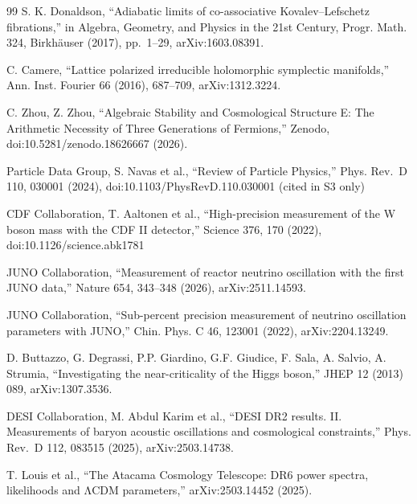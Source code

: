 \begin{thebibliography}{99}
 S. K. Donaldson, ``Adiabatic limits of co-associative Kovalev--Lefschetz fibrations,'' in Algebra, Geometry, and Physics in the 21st Century, Progr. Math. 324, Birkhäuser (2017), pp.~1--29, arXiv:1603.08391.

 C. Camere, ``Lattice polarized irreducible holomorphic symplectic manifolds,'' Ann. Inst. Fourier 66 (2016), 687--709, arXiv:1312.3224.

 C. Zhou, Z. Zhou, ``Algebraic Stability and Cosmological Structure E: The Arithmetic Necessity of Three Generations of Fermions,'' Zenodo, doi:10.5281/zenodo.18626667 (2026).

 Particle Data Group, S. Navas et al., ``Review of Particle Physics,'' Phys. Rev.~D 110, 030001 (2024), doi:10.1103/PhysRevD.110.030001 (cited in S3 only)

 CDF Collaboration, T. Aaltonen et al., ``High-precision measurement of the W boson mass with the CDF II detector,'' Science 376, 170 (2022), doi:10.1126/science.abk1781

 JUNO Collaboration, ``Measurement of reactor neutrino oscillation with the first JUNO data,'' Nature 654, 343--348 (2026), arXiv:2511.14593.

 JUNO Collaboration, ``Sub-percent precision measurement of neutrino oscillation parameters with JUNO,'' Chin. Phys. C 46, 123001 (2022), arXiv:2204.13249.

 D. Buttazzo, G. Degrassi, P.P. Giardino, G.F. Giudice, F. Sala, A. Salvio, A. Strumia, ``Investigating the near-criticality of the Higgs boson,'' JHEP 12 (2013) 089, arXiv:1307.3536.

 DESI Collaboration, M. Abdul Karim et al., ``DESI DR2 results. II. Measurements of baryon acoustic oscillations and cosmological constraints,'' Phys. Rev.~D 112, 083515 (2025), arXiv:2503.14738.

 T. Louis et al., ``The Atacama Cosmology Telescope: DR6 power spectra, likelihoods and ΛCDM parameters,'' arXiv:2503.14452 (2025).

\end{thebibliography}
